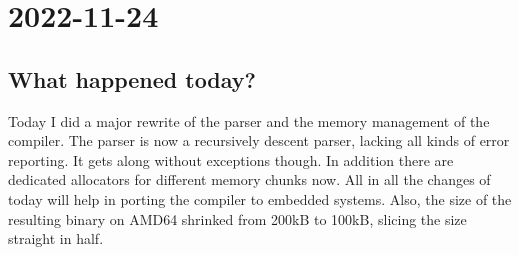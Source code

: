 \documentclass[12pt, article]{article}
\begin{document}
\section{2022-11-24}

\subsection{What happened today?}

Today I did a major rewrite of the parser and the memory management of
the compiler.
The parser is now a recursively descent parser, lacking all kinds of
error reporting.
It gets along without exceptions though.
In addition there are dedicated allocators for different memory chunks
now.
All in all the changes of today will help in porting the compiler to
embedded systems.
Also, the size of the resulting binary on AMD64 shrinked from 200kB to
100kB, slicing the size straight in half.
\end{document}
